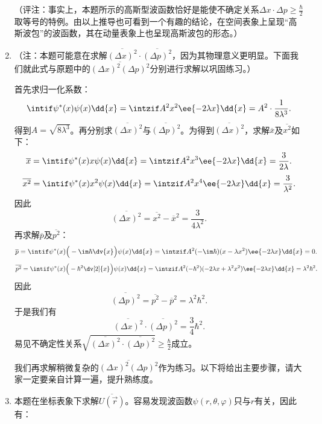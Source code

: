 \begin{enumerate}[label=2.\arabic*]
（评注：事实上，本题所示的高斯型波函数恰好是能使不确定关系$\Delta x\cdot\Delta p\geq\frac{\hbar}{2}$取等号的特例。由以上推导也可看到一个有趣的结论，在空间表象上呈现“高斯波包”的波函数，其在动量表象上也呈现高斯波包的形态。）

\item
（注：本题可能意在求解$\overline{(\Delta x)^2}\cdot\overline{(\Delta p)^2}$，因为其物理意义更明显。下面我们就此式与原题中的$\overline{(\Delta x)^2(\Delta p)^2}$分别进行求解以巩固练习。）

首先求归一化系数：
\[\intif \psi^*(x)\psi(x)\dd{x} = \intzif A^2 x^2 \ee{-2\lambda x}\dd{x} = A^2\cdot \frac{1}{8\lambda^3}.\]
得到$A = \sqrt{8\lambda^3}$。再分别求$\overline{(\Delta x)^2}$与$\overline{(\Delta p)^2}$。为得到$\overline{(\Delta x)^2}$，求解$\overline{x}$及$\overline{x^2}$如下：
\[\overline{x} = \intif \psi^*(x)x\psi(x)\dd{x} = \intzif A^2 x^3 \ee{-2\lambda x}\dd{x} = \frac{3}{2\lambda}. \]
\[\overline{x^2} = \intif \psi^*(x)x^2\psi(x)\dd{x} = \intzif A^2 x^4 \ee{-2\lambda x}\dd{x} = \frac{3}{\lambda^2}. \]
因此
\[\overline{(\Delta x)^2} = \overline{x^2}-\overline{x}^2 = \frac{3}{4\lambda^2}.\]
再求解$\overline{p}$及$\overline{p^2}$：
\[\overline{p} = \intif \psi^*(x)\Big(-\im\hbar \dv{x}\Big)\psi(x)\dd{x} = \intzif A^2 (-\im\hbar)(x-\lambda x^2)\ee{-2\lambda x}\dd{x} = 0. \]
\[\overline{p^2} = \intif \psi^*(x)\Big(-\hbar^2 \dv[2]{x}\Big)\psi(x)\dd{x} = \intzif A^2 (-\hbar^2)(-2\lambda x+\lambda^2 x^2)\ee{-2\lambda x}\dd{x} = \lambda^2\hbar^2. \]
因此
\[\overline{(\Delta p)^2} = \overline{p^2}-\overline{p}^2 = \lambda^2 \hbar^2.\]
于是我们有
\[\overline{(\Delta x)^2}\cdot\overline{(\Delta p)^2} = \frac{3}{4}\hbar^2.\]
易见不确定性关系$\sqrt{\overline{(\Delta x)^2}\cdot\overline{(\Delta p)^2}} \geq \frac{\hbar}{2}$成立。

我们再求解稍微复杂的$\overline{(\Delta x)^2(\Delta p)^2}$作为练习。以下将给出主要步骤，请大家一定要亲自计算一遍，提升熟练度。

\item
本题在坐标表象下求解$\overline{U(\vec{r})}$。容易发现波函数$\psi(r,\theta,\varphi)$只与$r$有关，因此有：


\end{enumerate}
